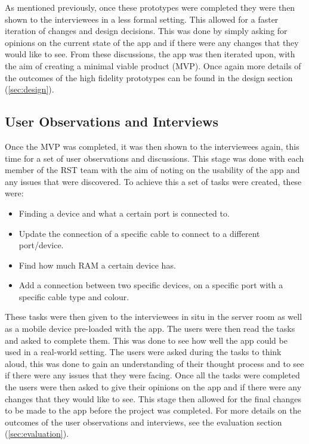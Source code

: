 \documentclass [11pt,a4paper]{article}
\begin{document}
As mentioned previously, once these prototypes were completed they were then shown to the interviewees in a less formal setting. This allowed for a faster iteration of changes and design decisions. This was done by simply asking for opinions on the current state of the app and if there were any changes that they would like to see. From these discussions, the app was then iterated upon, with the aim of creating a minimal viable product (MVP). Once again more details of the outcomes of the high fidelity prototypes can be found in the design section (\ref{sec:design}).

\subsection{User Observations and Interviews}
\label{sec:user_observations_and_interviews}
Once the MVP was completed, it was then shown to the interviewees again, this time for a set of user observations and discussions. This stage was done with each member of the RST team with the aim of noting on the usability of the app and any issues that were discovered. To achieve this a set of tasks were created, these were:
\begin{itemize}
    \item Finding a device and what a certain port is connected to.
    \item Update the connection of a specific cable to connect to a different port/device.
    \item Find how much RAM a certain device has.
    \item Add a connection between two specific devices, on a specific port with a specific cable type and colour.
\end{itemize}

These tasks were then given to the interviewees in situ in the server room as well as a mobile device pre-loaded with the app. The users were then read the tasks and asked to complete them. This was done to see how well the app could be used in a real-world setting. The users were asked during the tasks to think aloud, this was done to gain an understanding of their thought process and to see if there were any issues that they were facing. Once all the tasks were completed the users were then asked to give their opinions on the app and if there were any changes that they would like to see. This stage then allowed for the final changes to be made to the app before the project was completed. For more details on the outcomes of the user observations and interviews, see the evaluation section (\ref{sec:evaluation}).
\end{document}
